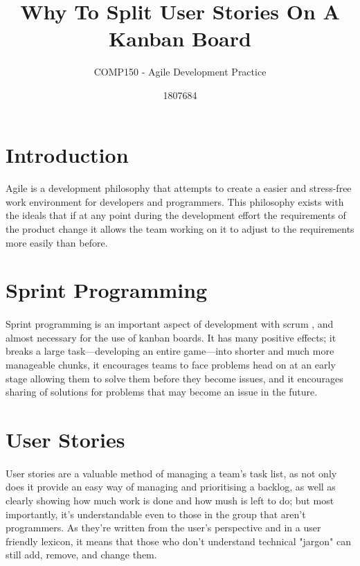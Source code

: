 \documentclass{scrartcl}
\title{Why To Split User Stories On A Kanban Board}
\subtitle{COMP150 - Agile Development Practice}
\author{1807684}
\begin{document}
\maketitle

\section{Introduction}
\paragraph{}
Agile is a development philosophy that attempts to create a easier and stress-free work environment for developers and programmers. This philosophy exists with the ideals that if at any point during the development effort the requirements of the product change it allows the team working on it to adjust to the requirements more easily than before. 

\section{Sprint Programming}
\paragraph{}
Sprint programming is an important aspect of development with scrum , and almost necessary for the use of kanban boards. It has many positive effects; it breaks a large task—developing an entire game—into shorter and much more manageable chunks, it encourages teams to face problems head on at an early stage allowing them to solve them before they become issues, and it encourages sharing of solutions for problems that may become an issue in the future.

\section{User Stories}
\paragraph{}
User stories are a valuable method of managing a team's task list, as not only does it provide an easy way of managing and prioritising a backlog, as well as clearly showing how much work is done and how mush is left to do; but most importantly, it's understandable even to those in the group that aren't programmers. As they're written from the user's perspective and in a user friendly lexicon, it means that those who don't understand technical "jargon" can still add, remove, and change them. %
\end{document}
